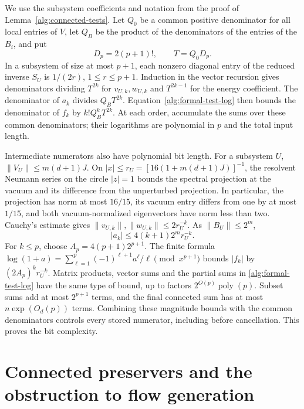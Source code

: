 \documentclass[reqno]{amsart}
\theoremstyle{definition}
\theoremstyle{remark}
\begin{document}
We use the subsystem coefficients and notation from the proof of
Lemma~\ref{alg:connected-tests}.  Let \(Q_0\) be a common positive denominator for all local
entries of \(V\), let \(Q_B\) be the product of the denominators
of the entries of the \(B_i\), and put
\[
 D_p=2(p+1)!,\qquad T=Q_0D_p .
 \]
In a subsystem of size at most \(p+1\), each nonzero diagonal
entry of the reduced inverse \(S_U\) is \(1/(2r)\),
\(1\le r\le p+1\).  Induction in the vector recursion gives
denominators dividing \(T^{2k}\) for \(v_{U,k},w_{U,k}\)
and \(T^{2k-1}\) for the energy coefficient.
The denominator of \(a_k\) divides \(Q_BT^{2k}\).
Equation~\eqref{alg:formal-test-log} then bounds the denominator
of \(f_k\) by \(k!Q_B^kT^{2k}\).
At each order, accumulate the sums over these common
denominators; their logarithms are polynomial in
\(p\) and the total input length.

Intermediate numerators also have polynomial bit length.
For a subsystem \(U\), \(\|V_U\|\le m(d+1)J\).
On \(|x|\le r_U=[16(1+m(d+1)J)]^{-1}\), the resolvent
Neumann series on the circle \(|z|=1\) bounds the spectral
projection at the vacuum and its difference from the
unperturbed projection.  In particular, the projection has
norm at most \(16/15\), its vacuum entry differs from one by
at most \(1/15\), and both vacuum-normalized eigenvectors have
norm less than two.  Cauchy's estimate gives
\(\|v_{U,k}\|,\|w_{U,k}\|\le2r_U^{-k}\).
As \(\|B_U\|\le2^m\),
\[
 |a_k|\le4(k+1)2^m r_U^{-k}.
\]
For \(k\le p\), choose \(A_p=4(p+1)2^{p+1}\).
The finite formula
\(\log(1+a)=\sum_{\ell=1}^p(-1)^{\ell+1}a^\ell/\ell
 \pmod{x^{p+1}}\)
bounds \(|f_k|\) by \((2A_p)^kr_U^{-k}\).
Matrix products, vector sums and the partial sums in
\eqref{alg:formal-test-log} have the same type of bound, up to
factors \(2^{O(p)}\operatorname{poly}(p)\).
Subset sums add at most \(2^{p+1}\) terms, and the final
connected sum has at most \(n\exp(O_d(p))\) terms.
Combining these magnitude bounds with the common denominators
controls every stored numerator, including before cancellation.
This proves the bit complexity.


\section{Connected preservers and the obstruction to flow generation}
\label{glob:section}
\end{document}
